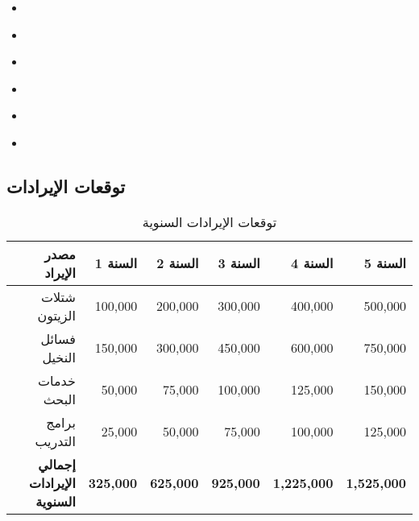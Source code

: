 \begin{itemize}
    \item \textbf{} 
    \item \textbf{} 
    \item \textbf{} 
    \item \textbf{} 
    \item \textbf{} 
    \item \textbf{} 
\end{itemize}

\subsection{توقعات الإيرادات}

\begin{table}[h]
\centering
\begin{tabular}{|r|r|r|r|r|r|}
\hline
\textbf{مصدر الإيراد} & \textbf{السنة 1} & \textbf{السنة 2} & \textbf{السنة 3} & \textbf{السنة 4} & \textbf{السنة 5} \\
\hline
شتلات الزيتون & 100,000 & 200,000 & 300,000 & 400,000 & 500,000 \\
فسائل النخيل & 150,000 & 300,000 & 450,000 & 600,000 & 750,000 \\
خدمات البحث & 50,000 & 75,000 & 100,000 & 125,000 & 150,000 \\
برامج التدريب & 25,000 & 50,000 & 75,000 & 100,000 & 125,000 \\
\hline
\textbf{إجمالي الإيرادات السنوية} & \textbf{325,000} & \textbf{625,000} & \textbf{925,000} & \textbf{1,225,000} & \textbf{1,525,000} \\
\hline
\end{tabular}
\caption{توقعات الإيرادات السنوية}
\end{table}

